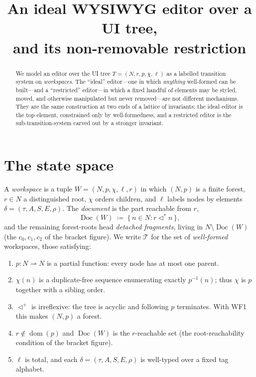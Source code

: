 \documentclass[11pt]{article}
\title{An ideal WYSIWYG editor over a UI tree,\\[2pt]
       and its non-removable restriction}
\author{}
\date{}
\DeclareMathOperator{\Dom}{dom}
\DeclareMathOperator{\Doc}{Doc}
\newcommand{\Tree}{\mathcal{T}}              %
\newcommand{\dleq}{\vartriangleleft^{*}}     %
\newcommand{\dlplus}{\vartriangleleft^{+}}   %
\newcommand{\pfun}{\rightharpoonup}          %
\theoremstyle{definition}
\theoremstyle{plain}
\begin{document}
\maketitle

\begin{abstract}
We model an editor over the UI tree $T=(N,r,p,\chi,\ell)$ as a labelled
transition system on \emph{workspaces}. The ``ideal'' editor---one in which
\emph{anything} well-formed can be built---and a ``restricted'' editor---in which
a fixed handful of elements may be styled, moved, and otherwise manipulated but
never removed---are not different mechanisms. They are the same construction at
two ends of a lattice of invariants: the ideal editor is the top element,
constrained only by well-formedness, and a restricted editor is the
sub-transition-system carved out by a stronger invariant.
\end{abstract}

\section{The state space}
A \emph{workspace} is a tuple $W=(N,p,\chi,\ell,r)$ in which $(N,p)$ is a finite
forest, $r\in N$ a distinguished root, $\chi$ orders children, and $\ell$ labels
nodes by elements $\delta=(\tau,A,S,E,\rho)$. The \emph{document} is the part
reachable from $r$,
\[
  \Doc(W)\;\coloneqq\;\{\,n\in N : r\dleq n\,\},
\]
and the remaining forest-roots head \emph{detached fragments}, living in
$N\setminus\Doc(W)$ (the $c_0,c_1,c_2$ of the bracket figure). We write $\Tree$
for the set of \emph{well-formed} workspaces, those satisfying:

% 

\begin{enumerate}[label=\textbf{WF\arabic*.}, leftmargin=*, itemsep=2pt]
  \item $p:N\pfun N$ is a partial function: every node has at most one parent.
  \item $\chi(n)$ is a duplicate-free sequence enumerating exactly $p^{-1}(n)$;
        thus $\chi$ is $p$ together with a sibling order.
  \item $\dlplus$ is irreflexive: the tree is acyclic and following $p$
        terminates. With WF1 this makes $(N,p)$ a forest.
  \item $r\notin\Dom(p)$ and $\Doc(W)$ is the $r$-reachable set
        (the root-reachability condition of the bracket figure).
  \item $\ell$ is total, and each $\delta=(\tau,A,S,E,\rho)$ is well-typed over a
        fixed tag alphabet.
\end{enumerate}
\end{document}

